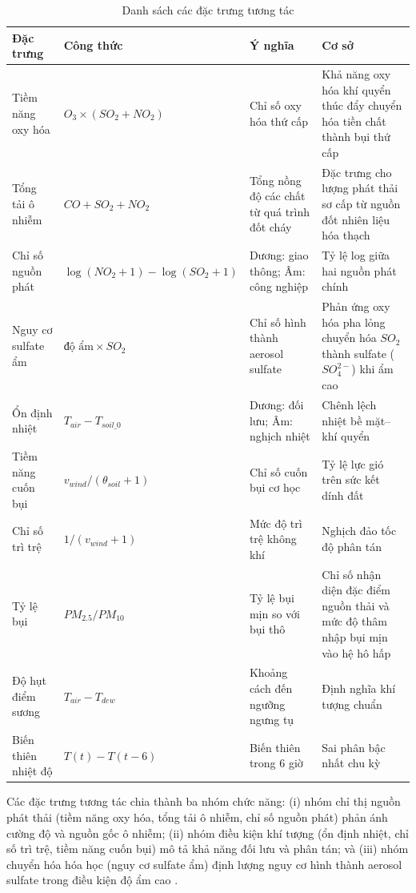 \begin{table}[H]
    \centering
    \caption{Danh sách các đặc trưng tương tác}
    \label{tab:dac_trung_tuong_tac}
    \renewcommand{\arraystretch}{1.3}
    \begin{tabular}{p{3cm} p{3.5cm} p{4cm} p{3.5cm}}
    \toprule
    \textbf{Đặc trưng} & \textbf{Công thức} & \textbf{Ý nghĩa} & \textbf{Cơ sở} \\
    \midrule
    Tiềm năng oxy hóa & $O_3 \times (SO_2 + NO_2)$ & Chỉ số oxy hóa thứ cấp & Khả năng oxy hóa khí quyển thúc đẩy chuyển hóa tiền chất thành bụi thứ cấp \\
    Tổng tải ô nhiễm & $CO + SO_2 + NO_2$ & Tổng nồng độ các chất từ quá trình đốt cháy & Đặc trưng cho lượng phát thải sơ cấp từ nguồn đốt nhiên liệu hóa thạch \\
    Chỉ số nguồn phát & $\log(NO_2+1) - \log(SO_2+1)$ & Dương: giao thông; Âm: công nghiệp & Tỷ lệ log giữa hai nguồn phát chính \\
    Nguy cơ sulfate ẩm & $\text{độ ẩm} \times SO_2$ & Chỉ số hình thành aerosol sulfate & Phản ứng oxy hóa pha lỏng chuyển hóa $SO_2$ thành sulfate ($SO_4^{2-}$) khi ẩm cao \\
    Ổn định nhiệt & $T_{air} - T_{soil\_0}$ & Dương: đối lưu; Âm: nghịch nhiệt & Chênh lệch nhiệt bề mặt--khí quyển \\
    Tiềm năng cuốn bụi & $v_{wind} / (\theta_{soil} + 1)$ & Chỉ số cuốn bụi cơ học & Tỷ lệ lực gió trên sức kết dính đất \\
    Chỉ số trì trệ & $1 / (v_{wind} + 1)$ & Mức độ trì trệ không khí & Nghịch đảo tốc độ phân tán \\
    Tỷ lệ bụi & $PM_{2.5} / PM_{10}$ & Tỷ lệ bụi mịn so với bụi thô & Chỉ số nhận diện đặc điểm nguồn thải và mức độ thâm nhập bụi mịn vào hệ hô hấp \\
    Độ hụt điểm sương & $T_{air} - T_{dew}$ & Khoảng cách đến ngưỡng ngưng tụ & Định nghĩa khí tượng chuẩn \\
    Biến thiên nhiệt độ & $T(t) - T(t-6)$ & Biến thiên trong 6 giờ & Sai phân bậc nhất chu kỳ \\
    \bottomrule
    \end{tabular}
\end{table}


Các đặc trưng tương tác chia thành ba nhóm chức năng: (i) nhóm chỉ thị nguồn phát thải (tiềm năng oxy hóa, tổng tải ô nhiễm, chỉ số nguồn phát) phản ánh cường độ và nguồn gốc ô nhiễm; (ii) nhóm điều kiện khí tượng (ổn định nhiệt, chỉ số trì trệ, tiềm năng cuốn bụi) mô tả khả năng đối lưu và phân tán; và (iii) nhóm chuyển hóa hóa học (nguy cơ sulfate ẩm) định lượng nguy cơ hình thành aerosol sulfate trong điều kiện độ ẩm cao \cite{le2024environmental}.

